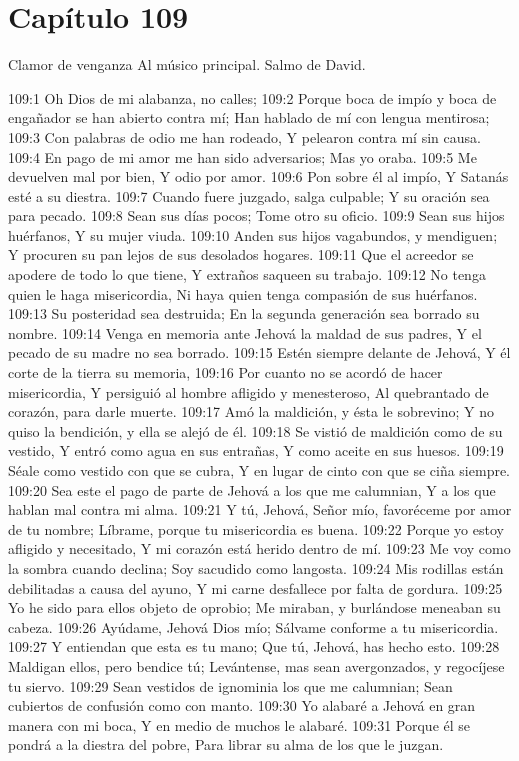 \section*{Capítulo 109}
Clamor de venganza 
Al músico principal. Salmo de David. 
 
109:1 Oh Dios de mi alabanza, no calles; 
109:2 Porque boca de impío y boca de engañador se han abierto contra mí; 
Han hablado de mí con lengua mentirosa; 
109:3 Con palabras de odio me han rodeado, 
Y pelearon contra mí sin causa. 
109:4 En pago de mi amor me han sido adversarios; 
Mas yo oraba. 
109:5 Me devuelven mal por bien, 
Y odio por amor. 
109:6 Pon sobre él al impío, 
Y Satanás esté a su diestra. 
109:7 Cuando fuere juzgado, salga culpable; 
Y su oración sea para pecado. 
109:8 Sean sus días pocos; 
Tome otro su oficio. 
109:9 Sean sus hijos huérfanos, 
Y su mujer viuda. 
109:10 Anden sus hijos vagabundos, y mendiguen; 
Y procuren su pan lejos de sus desolados hogares. 
109:11 Que el acreedor se apodere de todo lo que tiene, 
Y extraños saqueen su trabajo. 
109:12 No tenga quien le haga misericordia, 
Ni haya quien tenga compasión de sus huérfanos. 
109:13 Su posteridad sea destruida; 
En la segunda generación sea borrado su nombre. 
109:14 Venga en memoria ante Jehová la maldad de sus padres, 
Y el pecado de su madre no sea borrado. 
109:15 Estén siempre delante de Jehová, 
Y él corte de la tierra su memoria, 
109:16 Por cuanto no se acordó de hacer misericordia, 
Y persiguió al hombre afligido y menesteroso, 
Al quebrantado de corazón, para darle muerte. 
109:17 Amó la maldición, y ésta le sobrevino; 
Y no quiso la bendición, y ella se alejó de él. 
109:18 Se vistió de maldición como de su vestido, 
Y entró como agua en sus entrañas, 
Y como aceite en sus huesos. 
109:19 Séale como vestido con que se cubra, 
Y en lugar de cinto con que se ciña siempre. 
109:20 Sea este el pago de parte de Jehová a los que me calumnian, 
Y a los que hablan mal contra mi alma. 
109:21 Y tú, Jehová, Señor mío, favoréceme por amor de tu nombre; 
Líbrame, porque tu misericordia es buena. 
109:22 Porque yo estoy afligido y necesitado, 
Y mi corazón está herido dentro de mí. 
109:23 Me voy como la sombra cuando declina; 
Soy sacudido como langosta. 
109:24 Mis rodillas están debilitadas a causa del ayuno, 
Y mi carne desfallece por falta de gordura. 
109:25 Yo he sido para ellos objeto de oprobio; 
Me miraban, y burlándose meneaban su cabeza. 
109:26 Ayúdame, Jehová Dios mío; 
Sálvame conforme a tu misericordia. 
109:27 Y entiendan que esta es tu mano; 
Que tú, Jehová, has hecho esto. 
109:28 Maldigan ellos, pero bendice tú; 
Levántense, mas sean avergonzados, y regocíjese tu siervo. 
109:29 Sean vestidos de ignominia los que me calumnian; 
Sean cubiertos de confusión como con manto. 
109:30 Yo alabaré a Jehová en gran manera con mi boca, 
Y en medio de muchos le alabaré. 
109:31 Porque él se pondrá a la diestra del pobre, 
Para librar su alma de los que le juzgan. 

